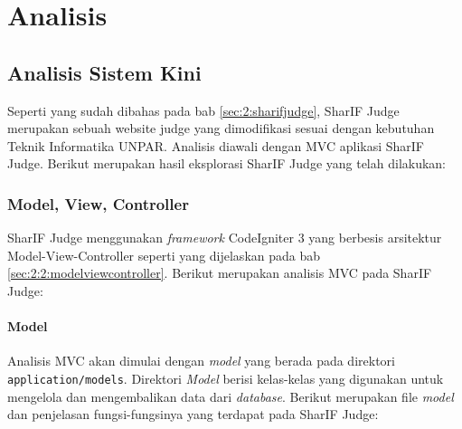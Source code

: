 \chapter{Analisis}
\label{chap:analisis}


\section{Analisis Sistem Kini}
\label{sec:3:sistemkini}

Seperti yang sudah dibahas pada bab \ref{sec:2:sharifjudge}, SharIF Judge merupakan sebuah website judge yang dimodifikasi sesuai dengan kebutuhan Teknik Informatika UNPAR. Analisis diawali dengan MVC aplikasi SharIF Judge. Berikut merupakan hasil eksplorasi SharIF Judge yang telah dilakukan:

\subsection{Model, View, Controller}
\label{sec:3:1:modelviewcontroller}

SharIF Judge menggunakan \textit{framework} CodeIgniter 3 yang berbesis arsitektur Model-View-Controller seperti yang dijelaskan pada bab \ref{sec:2:2:modelviewcontroller}. Berikut merupakan analisis MVC pada SharIF Judge:

\subsubsection{Model}
\label{sec:3:1:1:model}

Analisis MVC akan dimulai dengan \textit{model} yang berada pada direktori \verb|application/models|. Direktori \textit{Model} berisi kelas-kelas yang digunakan untuk mengelola dan mengembalikan data dari \textit{database}. Berikut merupakan file \textit{model} dan penjelasan fungsi-fungsinya yang terdapat pada SharIF Judge:

